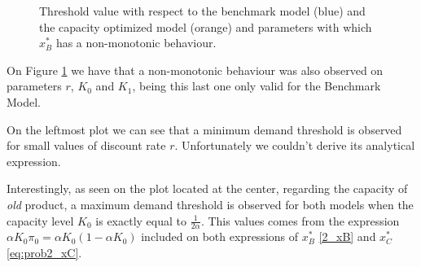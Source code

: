 \begin{figure}[!htb]
	\begin{subfigmatrix}{3}
	\end{subfigmatrix}
	\caption{Threshold value with respect to the benchmark model (blue) and the capacity optimized model (orange) and parameters with which  $x^*_B$ has a non-monotonic behaviour.}
	\label{fig:2_x1}
\end{figure}

On Figure \ref{fig:2_x1} we have that a non-monotonic behaviour was also observed on parameters $r$, $K_0$ and $K_1$, being this last one only valid for the Benchmark Model.

On the leftmost plot we can see that a minimum demand threshold is observed for small values of discount rate $r$. Unfortunately we couldn't derive its analytical expression.

Interestingly, as seen on the plot located at the center, regarding the capacity of \textit{old} product, a maximum demand threshold is observed for both models when the capacity level $K_0$ is exactly equal to $\frac{1}{2 \alpha}$. This values comes from the expression $\alpha K_0 \pi_0=\alpha K_0 (1-\alpha K_0)$ included on both expressions of $x_B^*$ \eqref{2_xB} and $x^*_C$ \eqref{eq:prob2_xC}.

